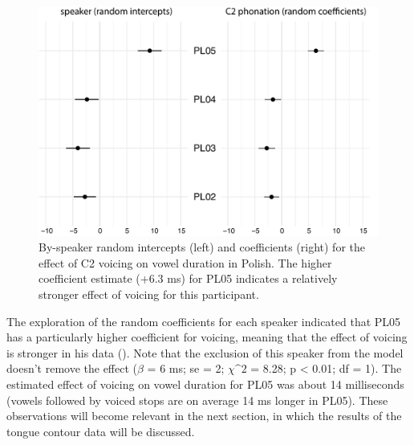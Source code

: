 \documentclass[authoryear, 5p]{elsarticle}
\begin{document}
\begin{figure}
    \centering
    \includegraphics[height=.3\textwidth]{fig/polish-re.pdf}
    \caption{By-speaker random intercepts (left) and coefficients (right) for the effect of C2 voicing on vowel duration in Polish. The higher coefficient estimate (+6.3 ms) for PL05 indicates a relatively stronger effect of voicing for this participant.}
    \label{f:polish-re}
\end{figure}

The exploration of the random coefficients for each speaker indicated
that PL05 has a particularly higher coefficient for voicing, meaning
that the effect of voicing is stronger in his data ().
Note that the exclusion of this speaker from the model doesn't remove
the effect (\(\beta\) = 6 ms; se = 2; \(\chi\^2\) = 8.28; p \textless{}
0.01; df = 1). The estimated effect of voicing on vowel duration for
PL05 was about 14 milliseconds (vowels followed by voiced stops are on
average 14 ms longer in PL05). These observations will become relevant
in the next section, in which the results of the tongue contour data
will be discussed.


\end{document}
